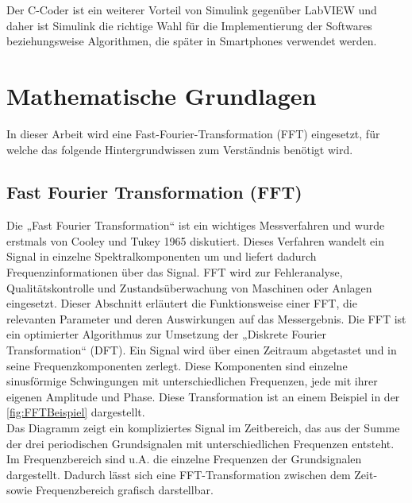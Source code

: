 Der C-Coder ist ein weiterer Vorteil von Simulink gegenüber LabVIEW und daher ist Simulink die richtige Wahl für die Implementierung der Softwares beziehungsweise Algorithmen, die später in Smartphones verwendet werden.






\section{Mathematische Grundlagen}

In dieser Arbeit wird eine Fast-Fourier-Transformation (FFT) eingesetzt, für welche das folgende Hintergrundwissen zum Verständnis benötigt wird.
\subsection{Fast Fourier Transformation (FFT)} \label{abs:FFT}

Die „Fast Fourier Transformation“ ist ein wichtiges Messverfahren und wurde erstmals von Cooley und Tukey 1965 diskutiert. Dieses Verfahren wandelt ein Signal in einzelne Spektralkomponenten um und liefert dadurch Frequenzinformationen über das Signal. FFT wird zur Fehleranalyse, Qualitätskontrolle und Zustandsüberwachung von Maschinen oder Anlagen eingesetzt. Dieser Abschnitt erläutert die Funktionsweise einer FFT, die relevanten Parameter und deren Auswirkungen auf das Messergebnis.
Die FFT ist ein optimierter Algorithmus zur Umsetzung der „Diskrete Fourier Transformation“ (DFT). Ein Signal wird über einen Zeitraum abgetastet und in seine Frequenzkomponenten zerlegt. Diese Komponenten sind einzelne sinusförmige Schwingungen mit unterschiedlichen Frequenzen, jede mit ihrer eigenen Amplitude und Phase. Diese Transformation ist an einem Beispiel in der \autoref{fig:FFTBeispiel} dargestellt.\\
Das Diagramm zeigt ein kompliziertes Signal im Zeitbereich, das aus der Summe der drei periodischen Grundsignalen mit unterschiedlichen Frequenzen entsteht. Im Frequenzbereich sind u.A. die einzelne Frequenzen der Grundsignalen dargestellt. Dadurch lässt sich eine FFT-Transformation zwischen dem Zeit- sowie Frequenzbereich grafisch darstellbar.

